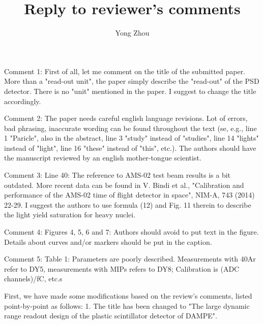 \documentclass[]{article}
\title{Reply to reviewer's comments}
\author{Yong Zhou}
\begin{document}
\maketitle

\section{}
Comment 1: First of all, let me comment on the title of the submitted paper. More than a "read-out unit", the paper simply describe the "read-out" of the PSD detector. There is no "unit" mentioned in the paper. I suggest to change the title accordingly.

Comment 2: The paper needs careful english language revisions. Lot of errors, bad phrasing, inaccurate wording can be found throughout the text (se, e.g., line 1 "Paricle", also in the abstract, line 3 "study" instead of "studies", line 14 "lights" instead of "light", line 16 "these" instead of "this", etc.). The authors should have the manuscript reviewed by an english mother-tongue scientist.

Comment 3: Line 40: The reference to AMS-02 test beam results is a bit outdated. More recent data can be found in V. Bindi et al., "Calibration and performance of the AMS-02 time of flight detector in space", NIM-A, 743 (2014) 22-29. I suggest the authors to use formula (12) and Fig. 11 therein to describe the light yield saturation for heavy nuclei.

Comment 4: Figures 4, 5, 6 and 7: Authors should avoid to put text in the figure. Details about curves and/or markers should be put in the caption.

Comment 5: Table 1: Parameters are poorly described. Measurements with 40Ar refer to DY5, measurements with MIPs refers to DY8; Calibration is (ADC channels)/fC, etc.s

First, we have made some modifications based on the review's comments, listed point-by-point as follows:
1. The title has been changed to "The large dynamic range readout design of the plastic scintillator detector of DAMPE".
\end{document}
